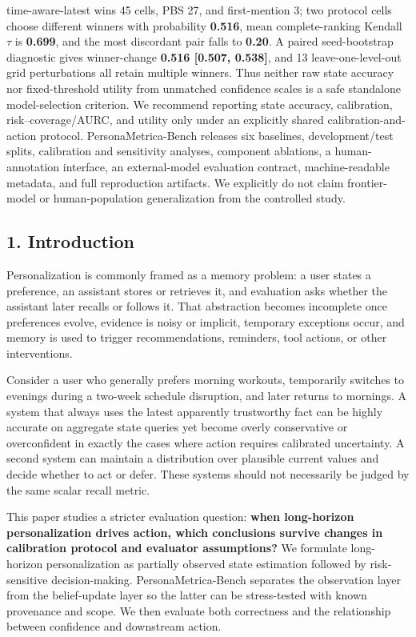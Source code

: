 \documentclass[
  10pt,
  letterpaper,
]{article}
\begin{document}
time-aware-latest wins 45 cells, PBS 27, and first-mention 3; two
protocol cells choose different winners with probability \textbf{0.516},
mean complete-ranking Kendall \(\tau\) is \textbf{0.699}, and the most
discordant pair falls to \textbf{0.20}. A paired seed-bootstrap
diagnostic gives winner-change \textbf{0.516 {[}0.507, 0.538{]}}, and 13
leave-one-level-out grid perturbations all retain multiple winners. Thus
neither raw state accuracy nor fixed-threshold utility from unmatched
confidence scales is a safe standalone model-selection criterion. We
recommend reporting state accuracy, calibration, risk--coverage/AURC,
and utility only under an explicitly shared calibration-and-action
protocol. PersonaMetrica-Bench releases six baselines, development/test
splits, calibration and sensitivity analyses, component ablations, a
human-annotation interface, an external-model evaluation contract,
machine-readable metadata, and full reproduction artifacts. We
explicitly do not claim frontier-model or human-population
generalization from the controlled study.

\subsection{1. Introduction}\label{introduction}

Personalization is commonly framed as a memory problem: a user states a
preference, an assistant stores or retrieves it, and evaluation asks
whether the assistant later recalls or follows it. That abstraction
becomes incomplete once preferences evolve, evidence is noisy or
implicit, temporary exceptions occur, and memory is used to trigger
recommendations, reminders, tool actions, or other interventions.

Consider a user who generally prefers morning workouts, temporarily
switches to evenings during a two-week schedule disruption, and later
returns to mornings. A system that always uses the latest apparently
trustworthy fact can be highly accurate on aggregate state queries yet
become overly conservative or overconfident in exactly the cases where
action requires calibrated uncertainty. A second system can maintain a
distribution over plausible current values and decide whether to act or
defer. These systems should not necessarily be judged by the same scalar
recall metric.

This paper studies a stricter evaluation question: \textbf{when
long-horizon personalization drives action, which conclusions survive
changes in calibration protocol and evaluator assumptions?} We formulate
long-horizon personalization as partially observed state estimation
followed by risk-sensitive decision-making. PersonaMetrica-Bench
separates the observation layer from the belief-update layer so the
latter can be stress-tested with known provenance and scope. We then
evaluate both correctness and the relationship between confidence and
downstream action.
\end{document}

